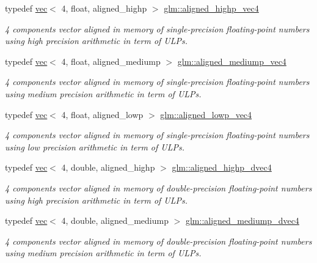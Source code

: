 \begin{DoxyCompactItemize}
typedef \hyperlink{structglm_1_1vec}{vec}$<$ 4, float, aligned\+\_\+highp $>$ \hyperlink{group__gtc__type__aligned_ga60d6561b0daa150c617f3a7a277e44ee}{glm\+::aligned\+\_\+highp\+\_\+vec4}
\begin{DoxyCompactList}\small\item\em 4 components vector aligned in memory of single-\/precision floating-\/point numbers using high precision arithmetic in term of U\+L\+Ps. \end{DoxyCompactList}\item 
typedef \hyperlink{structglm_1_1vec}{vec}$<$ 4, float, aligned\+\_\+mediump $>$ \hyperlink{group__gtc__type__aligned_ga83fa079eb8188b8acb4e90589ce5dddb}{glm\+::aligned\+\_\+mediump\+\_\+vec4}
\begin{DoxyCompactList}\small\item\em 4 components vector aligned in memory of single-\/precision floating-\/point numbers using medium precision arithmetic in term of U\+L\+Ps. \end{DoxyCompactList}\item 
typedef \hyperlink{structglm_1_1vec}{vec}$<$ 4, float, aligned\+\_\+lowp $>$ \hyperlink{group__gtc__type__aligned_gaba45497051d04e2aa681653c14fc023c}{glm\+::aligned\+\_\+lowp\+\_\+vec4}
\begin{DoxyCompactList}\small\item\em 4 components vector aligned in memory of single-\/precision floating-\/point numbers using low precision arithmetic in term of U\+L\+Ps. \end{DoxyCompactList}\item 
typedef \hyperlink{structglm_1_1vec}{vec}$<$ 4, double, aligned\+\_\+highp $>$ \hyperlink{group__gtc__type__aligned_ga4b7b03b9178c6f0574c26181a054beec}{glm\+::aligned\+\_\+highp\+\_\+dvec4}
\begin{DoxyCompactList}\small\item\em 4 components vector aligned in memory of double-\/precision floating-\/point numbers using high precision arithmetic in term of U\+L\+Ps. \end{DoxyCompactList}\item 
typedef \hyperlink{structglm_1_1vec}{vec}$<$ 4, double, aligned\+\_\+mediump $>$ \hyperlink{group__gtc__type__aligned_gab825a10044970cfc9b5fbb6cfa58b640}{glm\+::aligned\+\_\+mediump\+\_\+dvec4}
\begin{DoxyCompactList}\small\item\em 4 components vector aligned in memory of double-\/precision floating-\/point numbers using medium precision arithmetic in term of U\+L\+Ps. \end{DoxyCompactList}\item 

\end{DoxyCompactItemize}
